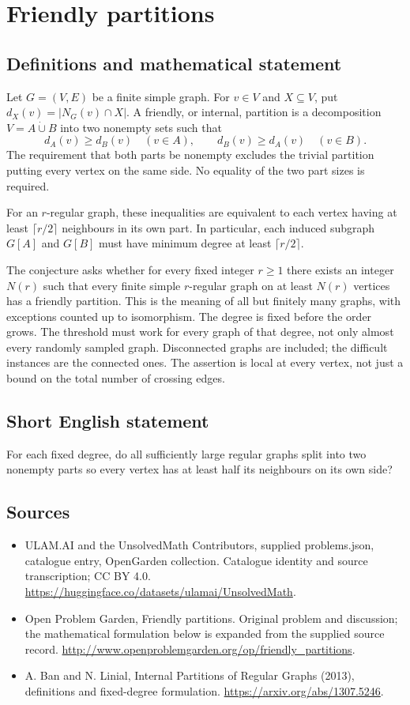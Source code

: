 \documentclass[11pt,a4paper]{article}
\begin{document}
\section*{Friendly partitions}\label{statement}

\subsection{Definitions and mathematical statement}
Let $G=(V,E)$ be a finite simple graph. For $v\in V$ and
$X\subseteq V$, put $d_X(v)=|N_G(v)\cap X|$. A friendly, or
internal, partition is a decomposition
$V=A\mathbin{\dot\cup}B$ into two nonempty sets such that
\[
 d_A(v)\geq d_B(v)\quad(v\in A),\qquad
 d_B(v)\geq d_A(v)\quad(v\in B).
\]
The requirement that both parts be nonempty excludes the trivial
partition putting every vertex on the same side. No equality of
the two part sizes is required.

For an $r$-regular graph, these inequalities are equivalent to
each vertex having at least $\lceil r/2\rceil$ neighbours in its
own part. In particular, each induced subgraph $G[A]$ and $G[B]$
must have minimum degree at least $\lceil r/2\rceil$.

The conjecture asks whether for every fixed integer $r\geq1$
there exists an integer $N(r)$ such that every finite simple
$r$-regular graph on at least $N(r)$ vertices has a friendly
partition. This is the meaning of all but finitely many graphs,
with exceptions counted up to isomorphism. The degree is fixed
before the order grows. The threshold must work for every graph
of that degree, not only almost every randomly sampled graph.
Disconnected graphs are included; the difficult instances are
the connected ones. The assertion is local at every vertex,
not just a bound on the total number of crossing edges.
\subsection{Short English statement}
For each fixed degree, do all sufficiently large regular graphs split into two nonempty parts so every vertex has at least half its neighbours on its own side?
\subsection{Sources}
\begin{itemize}
\item[S1] ULAM.AI and the UnsolvedMath Contributors, supplied problems.json, catalogue entry, OpenGarden collection. Catalogue identity and source transcription; CC BY 4.0.
\url{https://huggingface.co/datasets/ulamai/UnsolvedMath}.
\item[S2] Open Problem Garden, Friendly partitions. Original problem and discussion; the mathematical formulation below is expanded from the supplied source record.
\url{http://www.openproblemgarden.org/op/friendly_partitions}.
\item[S3] A. Ban and N. Linial, Internal Partitions of Regular Graphs (2013), definitions and fixed-degree formulation.
\url{https://arxiv.org/abs/1307.5246}.
\end{itemize}
\end{document}
